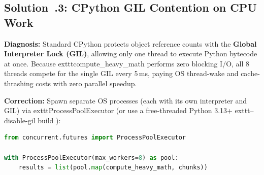 \subsection{Solution~\thechapter.3: CPython GIL Contention on CPU Work}
\textbf{Diagnosis:} Standard CPython protects object reference counts with the \textbf{Global Interpreter Lock (GIL)}, allowing only one thread to execute Python bytecode at once. Because 	exttt{compute\_heavy\_math} performs zero blocking I/O, all 8 threads compete for the single GIL every 5\,ms, paying OS thread-wake and cache-thrashing costs with zero parallel speedup.

\textbf{Correction:} Spawn separate OS processes (each with its own interpreter and GIL) via 	exttt{ProcessPoolExecutor} (or use a free-threaded Python 3.13+ 	exttt{--disable-gil} build \cite{pep703}):
\begin{lstlisting}[language=Python]
from concurrent.futures import ProcessPoolExecutor

with ProcessPoolExecutor(max_workers=8) as pool:
    results = list(pool.map(compute_heavy_math, chunks))
\end{lstlisting}

